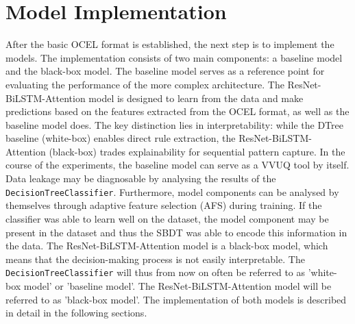 \section{Model Implementation}

After the basic OCEL format is established, the next step is to implement the models. The implementation consists of two main components: a baseline model and the black-box model. The baseline model serves as a reference point for evaluating the performance of the more complex architecture. The ResNet-BiLSTM-Attention model is designed to learn from the data and make predictions based on the features extracted from the OCEL format, as well as the baseline model does. The key distinction lies in interpretability: while the DTree baseline (white-box) enables direct rule extraction, the ResNet-BiLSTM-Attention (black-box) trades explainability for sequential pattern capture. In the course of the experiments, the baseline model can serve as a VVUQ tool by itself. Data leakage may be diagnosable by analysing the results of the \texttt{DecisionTreeClassifier}. Furthermore, model components can be analysed by themselves through adaptive feature selection (AFS) during training. If the classifier was able to learn well on the dataset, the model component may be present in the dataset and thus the SBDT was able to encode this information in the data. The ResNet-BiLSTM-Attention model is a black-box model, which means that the decision-making process is not easily interpretable. The \texttt{DecisionTreeClassifier} will thus from now on often be referred to as 'white-box model' or 'baseline model'. The ResNet-BiLSTM-Attention model will be referred to as 'black-box model'. The implementation of both models is described in detail in the following sections.

